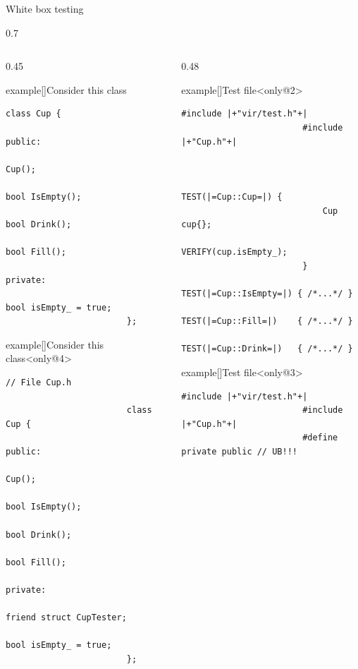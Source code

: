 \begin{frame}[fragile]{White box testing}
\begin{overlayarea}{\textwidth}{0.7\textheight}
\begin{columns}[T]
\begin{column}{0.45\textwidth}
\begin{varblock}{example}[\textwidth]{Consider this class}
\begin{lstlisting}[style=MyCpp]
                        class Cup {
                            public:
                            Cup();
                            bool IsEmpty();
                            bool Drink();
                            bool Fill();
                            private:
                            bool isEmpty_ = true;
                        };
                    \end{lstlisting}
                \end{varblock}
                \begin{varblock}{example}[\textwidth]{Consider this class}<only@4>
                    \begin{lstlisting}[style=MyCpp]
                        // File Cup.h

                        class Cup {
                            public:
                            Cup();
                            bool IsEmpty();
                            bool Drink();
                            bool Fill();
                            private:
                            friend struct CupTester;
                            bool isEmpty_ = true;
                        };
                    \end{lstlisting}
                \end{varblock}
            \end{column}
            \begin{column}{0.48\textwidth}
                \begin{varblock}{example}[\textwidth]{Test file}<only@2>
                    \begin{lstlisting}[style=MyCpp]
                        #include |+"vir/test.h"+|
                        #include |+"Cup.h"+|


                        TEST(|=Cup::Cup=|) {
                            Cup cup{};
                            VERIFY(cup.isEmpty_);
                        }
                        TEST(|=Cup::IsEmpty=|) { /*...*/ }
                        TEST(|=Cup::Fill=|)    { /*...*/ }
                        TEST(|=Cup::Drink=|)   { /*...*/ }
                    \end{lstlisting}
                \end{varblock}
                \begin{varblock}{example}[\textwidth]{Test file}<only@3>
                    \begin{lstlisting}[style=MyCpp]
                        #include |+"vir/test.h"+|
                        #include |+"Cup.h"+|
                        #define private public // UB!!!


\end{lstlisting}
\end{varblock}
\end{column}
\end{columns}
\end{overlayarea}
\end{frame}

